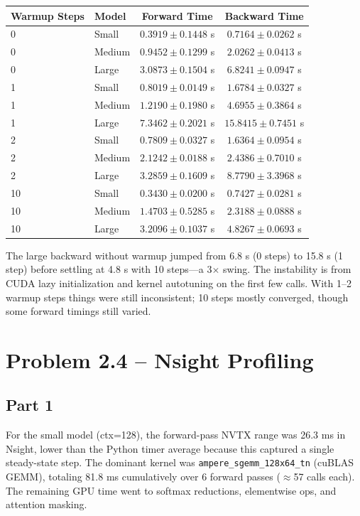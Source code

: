 \documentclass[11pt]{article}
\begin{document}
\begin{table}[h]
\centering
\begin{tabular}{llcc}
\toprule
Warmup Steps & Model & Forward Time & Backward Time \\
\midrule
0 & Small & $0.3919 \pm 0.1448$ s & $0.7164 \pm 0.0262$ s \\
0 & Medium & $0.9452 \pm 0.1299$ s & $2.0262 \pm 0.0413$ s \\
0 & Large & $3.0873 \pm 0.1504$ s & $6.8241 \pm 0.0947$ s \\
1 & Small & $0.8019 \pm 0.0149$ s & $1.6784 \pm 0.0327$ s \\
1 & Medium & $1.2190 \pm 0.1980$ s & $4.6955 \pm 0.3864$ s \\
1 & Large & $7.3462 \pm 0.2021$ s & $15.8415 \pm 0.7451$ s \\
2 & Small & $0.7809 \pm 0.0327$ s & $1.6364 \pm 0.0954$ s \\
2 & Medium & $2.1242 \pm 0.0188$ s & $2.4386 \pm 0.7010$ s \\
2 & Large & $3.2859 \pm 0.1609$ s & $8.7790 \pm 3.3968$ s \\
10 & Small & $0.3430 \pm 0.0200$ s & $0.7427 \pm 0.0281$ s \\
10 & Medium & $1.4703 \pm 0.5285$ s & $2.3188 \pm 0.0888$ s \\
10 & Large & $3.2096 \pm 0.1037$ s & $4.8267 \pm 0.0693$ s \\
\bottomrule
\end{tabular}
\end{table}

The large backward without warmup jumped from 6.8 s (0 steps) to 15.8 s (1 step) before settling at 4.8 s with 10 steps---a 3$\times$ swing. The instability is from CUDA lazy initialization and kernel autotuning on the first few calls. With 1--2 warmup steps things were still inconsistent; 10 steps mostly converged, though some forward timings still varied.


\section{Problem 2.4 -- Nsight Profiling}

\subsection*{Part 1}

For the small model (ctx=128), the forward-pass NVTX range was 26.3 ms in Nsight, lower than the Python timer average because this captured a single steady-state step. The dominant kernel was \texttt{ampere\_sgemm\_128x64\_tn} (cuBLAS GEMM), totaling 81.8 ms cumulatively over 6 forward passes ($\approx$57 calls each). The remaining GPU time went to softmax reductions, elementwise ops, and attention masking.
\end{document}
